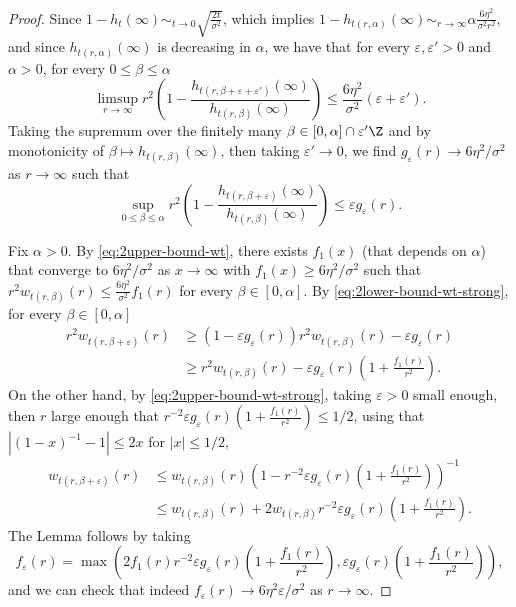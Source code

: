 \documentclass[10pt,a4paper]{article}
\begin{document}
\begin{proof}
Since $1-h_t(\infty) \sim_{t\to 0} \sqrt{\frac{2t}{\sigma^2}}$, which implies $1-h_{t(r,\alpha)}(\infty) \sim_{r\to\infty} \alpha \frac{6\eta^2}{\sigma^2 r^2}$, and since $h_{t(r,\alpha)}(\infty)$ is decreasing in $\alpha$, we have that for every $\varepsilon, \varepsilon'>0$ and $\alpha>0$, for every $0\leq \beta \leq \alpha$ %
\[ \limsup_{r\to\infty} r^2\left(1 - \frac{h_{t(r,\beta+\varepsilon+\varepsilon')}(\infty)}{h_{t(r,\beta)}(\infty)} \right) \leq \frac{6\eta^2}{\sigma^2} (\varepsilon+\varepsilon') . \]
Taking the supremum over the finitely many $\beta \in [0,\alpha] \cap \varepsilon' \Z$ and by monotonicity of $\beta \mapsto h_{t(r,\beta)}(\infty)$, then taking $\varepsilon'\to 0$, we find $g_\varepsilon(r) \to 6\eta^2/\sigma^2$ as $r\to\infty$ such that 
\begin{equation*}%
\sup_{0\leq \beta \leq \alpha} r^2\left(1 - \frac{h_{t(r,\beta+\varepsilon)}(\infty)}{h_{t(r,\beta)}(\infty)} \right) \leq \varepsilon g_\varepsilon(r) . 
\end{equation*}

Fix $\alpha>0$. 
By \eqref{eq:2upper-bound-wt}, there exists $f_1(x)$ (that depends on $\alpha$) that converge to $6\eta^2/\sigma^2$ as $x\to\infty$ with $f_1(x)\geq 6\eta^2/\sigma^2$ such that $r^2 w_{t(r,\beta)}(r) \leq \frac{6 \eta^2}{\sigma^2} f_1(r) $ for every $\beta \in [0,\alpha]$. 
By \eqref{eq:2lower-bound-wt-strong}, for every $\beta \in [0,\alpha]$
\begin{align*}
r^2 w_{t(r,\beta+\varepsilon)}(r) &\geq \left( 1 - \varepsilon g_\varepsilon(r)\right) r^2 w_{t(r,\beta)}(r) - \varepsilon g_\varepsilon(r) \\
&\geq r^2 w_{t(r,\beta)}(r) - \varepsilon g_\varepsilon(r) \left(1+ \frac{f_1(r)}{r^2}\right) .
\end{align*}
On the other hand, by \eqref{eq:2upper-bound-wt-strong}, taking $\varepsilon>0$ small enough, then $r$ large enough that $r^{-2} \varepsilon g_\varepsilon(r) \left( 1 + \frac{f_1(r)}{r^2} \right) \leq 1/2$, using that $|(1-x)^{-1} - 1| \leq 2x$ for $|x|\leq 1/2$, 
\begin{align*}
w_{t(r,\beta+\varepsilon)}(r) &\leq w_{t(r,\beta)}(r) \left( 1 - r^{-2} \varepsilon g_\varepsilon(r) \left( 1 + \frac{f_1(r)}{r^2} \right) \right)^{-1} \\
&\leq w_{t(r,\beta)}(r) + 2 w_{t(r,\beta)} r^{-2} \varepsilon g_\varepsilon(r) \left( 1 + \frac{f_1(r)}{r^2} \right) .
\end{align*}
The Lemma follows by taking 
\[ f_\varepsilon(r) = \max \left( 2f_1(r) r^{-2} \varepsilon g_\varepsilon(r) \left( 1 + \frac{f_1(r)}{r^2} \right) , \varepsilon g_\varepsilon(r) \left(1+ \frac{f_1(r)}{r^2}\right) \right) , \]
and we can check that indeed $f_\varepsilon(r) \to 6\eta^2 \varepsilon/\sigma^2$ as $r\to\infty$. 
\end{proof}
\end{document}
